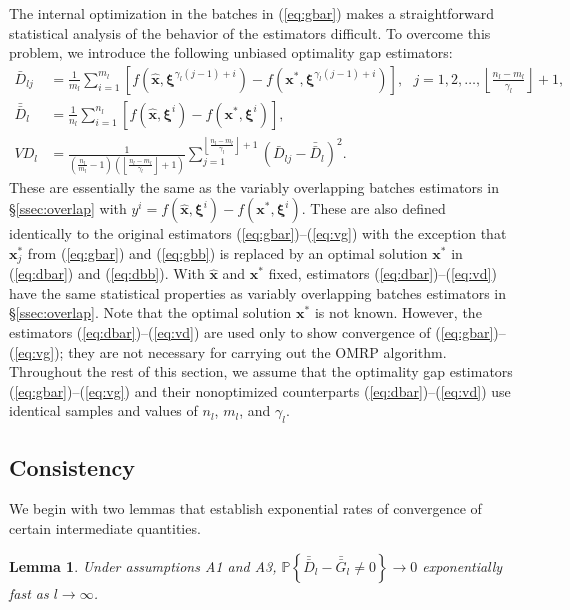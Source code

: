 \documentclass[12pt]{article}
\newtheorem{lemma}{Lemma}
\newcommand{\p}[1]{\mathbb{P} \left\{ #1 \right\}}
\newcommand{\x}{\mathbf{x}}
\newcommand{\xh}{{\hat{\x}}}
\newcommand{\xs}{\x^*}
\newcommand{\xit}{\boldsymbol{\xi}}
\newcommand{\xiti}{\xit^i}
\newcommand{\nbl}{\left\lfloor\tfrac{n_l-m_l}{\gamma_l}\right\rfloor+1}
\newcommand{\gb}{\bar{G}}
\newcommand{\gbb}{\bar{\gb}}
\newcommand{\db}{\bar{D}}
\newcommand{\dbb}{\bar{\db}}
\begin{document}
The internal optimization in the batches in (\ref{eq:gbar}) makes a straightforward statistical analysis of the behavior of the estimators difficult.  
To overcome this problem, we introduce the following unbiased optimality gap estimators:
\begin{align}
	\db_{lj} & = \frac{1}{m_l} \sum_{i=1}^{m_l} \left[ f(\xh,\xit^{\gamma_l(j-1)+i}) - f(\xs,\xit^{\gamma_l(j-1)+i}) \right],\ \ \ j = 1, 2, \dots, \nbl, \label{eq:dbar} \\
	\dbb_l & = \frac{1}{n_l} \sum_{i=1}^{n_l} \left[ f(\xh,\xiti) - f(\xs,\xiti) \right], \label{eq:dbb} \\
	VD_l & = \frac{1}{\left( \tfrac{n_l}{m_l} - 1 \right) \left(\nbl\right)} \sum_{j=1}^{\nbl} (\db_{lj} - \dbb_l)^2. \label{eq:vd}
\end{align}
These are essentially the same as the variably overlapping batches estimators in \S \ref{ssec:overlap} with $y^i = f(\xh,\xiti) - f(\xs,\xiti)$.  
These are also defined identically to the original estimators (\ref{eq:gbar})--(\ref{eq:vg}) with the exception that $\xs_j$ from (\ref{eq:gbar}) and (\ref{eq:gbb}) is replaced by an optimal solution $\xs$ in (\ref{eq:dbar}) and (\ref{eq:dbb}).  
With $\xh$ and $\xs$ fixed, estimators (\ref{eq:dbar})--(\ref{eq:vd}) have the same statistical properties as variably overlapping batches estimators in \S \ref{ssec:overlap}.  
Note that the optimal solution $\xs$ is not known. 
However, the estimators (\ref{eq:dbar})--(\ref{eq:vd}) are used only to show convergence of (\ref{eq:gbar})--(\ref{eq:vg}); they are not necessary for carrying out the OMRP algorithm.  
Throughout the rest of this section, we assume that the optimality gap estimators (\ref{eq:gbar})--(\ref{eq:vg}) and their nonoptimized counterparts (\ref{eq:dbar})--(\ref{eq:vd}) use identical samples and values of $n_
l$, 
$m_l$, and $\gamma_l$.  \smallskip 


\subsection{Consistency}
\label{subsec:conv} 

We begin with two lemmas that establish exponential rates of convergence of certain intermediate quantities.

\begin{lemma} \label{lem:gbb_prob}
	Under assumptions A1 and A3, $\p{\dbb_l - \gbb_l \neq 0} \rightarrow 0$ exponentially fast as $l \rightarrow \infty$.
\end{lemma}
\end{document}
